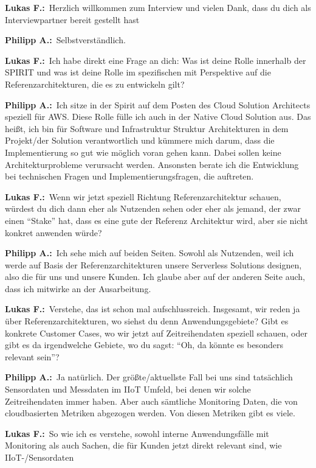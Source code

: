 
\newcommand{\LF}{\textbf{Lukas F.:}~}
\newcommand{\PA}{\textbf{Philipp A.:}~}

\LF	Herzlich willkommen zum Interview und vielen Dank, dass du dich als Interviewpartner bereit gestellt hast

\PA	 Selbstverständlich.

\LF	Ich habe direkt eine Frage an dich: Was ist deine Rolle innerhalb der SPIRIT und was ist deine Rolle im spezifischen mit Perspektive auf die Referenzarchitekturen, die es zu entwickeln gilt?

\PA	Ich sitze in der Spirit auf dem Posten des Cloud Solution Architects speziell für AWS. Diese Rolle fülle ich auch in der Native Cloud Solution aus. Das heißt, ich bin für Software und Infrastruktur Struktur Architekturen in dem Projekt/der Solution verantwortlich und kümmere mich darum, dass die Implementierung so gut wie möglich voran gehen kann. Dabei sollen keine Architekturprobleme verursacht werden. Ansonsten berate ich die Entwicklung  bei technischen Fragen und Implementierungsfragen, die auftreten.

\LF	Wenn wir jetzt speziell Richtung Referenzarchitektur schauen, würdest du dich dann eher als Nutzenden sehen oder eher als jemand, der zwar einen \enquote{Stake} hat, dass es eine gute der Referenz Architektur wird, aber sie nicht konkret anwenden würde?

\PA	 Ich sehe mich auf beiden Seiten. Sowohl als Nutzenden, weil ich werde auf Basis der Referenzarchitekturen unsere Serverless Solutions designen, also die für uns und unsere Kunden. Ich glaube aber auf der anderen Seite auch, dass ich mitwirke an der Ausarbeitung.

\LF	 Verstehe, das ist schon mal aufschlussreich. Insgesamt, wir reden ja über Referenzarchitekturen, wo siehst du denn Anwendungsgebiete? Gibt es konkrete Customer Cases, wo wir jetzt auf Zeitreihendaten speziell schauen, oder gibt es da irgendwelche Gebiete, wo du sagst: \enquote{Oh, da könnte es besonders relevant sein}?

\PA	 Ja natürlich. Der größte/aktuellste Fall bei uns sind tatsächlich Sensordaten und Messdaten im \ac{IIoT} Umfeld, bei denen wir solche Zeitreihendaten immer haben. Aber auch sämtliche Monitoring Daten, die von cloudbasierten Metriken abgezogen werden. Von diesen Metriken gibt es viele.

\LF	So wie ich es verstehe, sowohl interne Anwendungsfälle mit Monitoring als auch Sachen, die für Kunden jetzt direkt relevant sind, wie \ac{IIoT}-/Sensordaten

